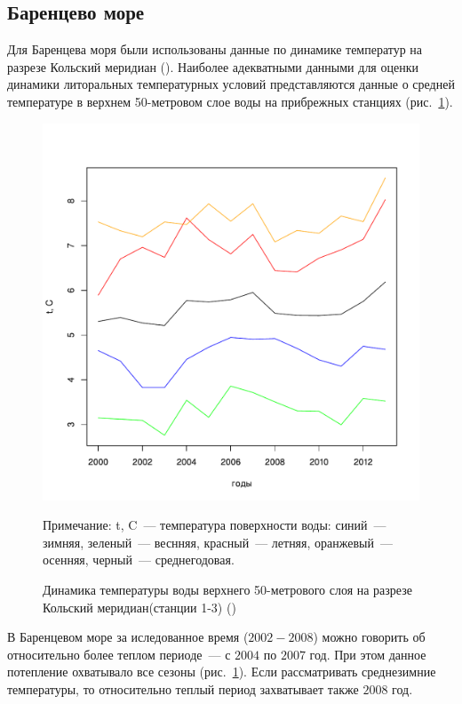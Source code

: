 		\subsection{Баренцево море}
Для Баренцева моря были использованы данные по динамике температур на разрезе Кольский меридиан (\cite{pinro}). 
Наиболее адекватными данными для оценки динамики литоральных температурных условий представляются данные о средней температуре в верхнем 50-метровом слое воды на прибрежных станциях (рис.~\ref{ris:Barents_temp_dynamic}).
	\begin{figure}[p]
    \includegraphics[width=\textwidth]{../Barenc_Sea/temperature/t_air_mean_season_year1.pdf}
    \caption{Динамика температуры воды верхнего 50-метрового слоя на разрезе Кольский меридиан(станции 1-3) (\cite{pinro})}

{\footnotesize Примечание: t, C~--- температура поверхности воды: синий~--- зимняя, зеленый~--- веснняя, красный~--- летняя, оранжевый~--- осенняя, черный~--- среднегодовая. }
    \label{ris:Barents_temp_dynamic}
	\end{figure}

В Баренцевом море за иследованное время ($2002 - 2008$) можно говорить об относительно более теплом периоде~--- с $2004$ по $2007$ год.
При этом данное потепление охватывало все сезоны (рис.~\ref{ris:Barents_temp_dynamic}).
Если рассматривать среднезимние температуры, то относительно теплый период захватывает также $2008$ год.


